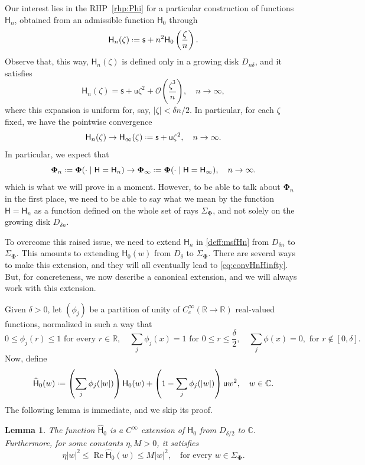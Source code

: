 \documentclass[reqno,a4paper,11pt]{amsart}
\DeclareMathOperator{\re}{Re}
\newcommand{\C}{\mathbb{C}}
\newcommand{\R}{\mathbb{R}}
\newcommand{\Boh}{\mathcal{O}}
\newcommand*{\deff}{\mathrel{\vcenter{\baselineskip0.5ex \lineskiplimit0pt
                     \hbox{\scriptsize.}\hbox{\scriptsize.}}}%
                     =}
\renewcommand{\bm}{\mathbf}
\newcommand{\msf}{\mathsf}
\newcommand{\wh}{\widehat}
\newcommand{\sad}{\msf s}
\newcommand{\uad}{\msf u}
\newtheorem{lemma}[theorem]{Lemma}
\theoremstyle{definition}
\theoremstyle{remark}
\numberwithin{equation}{section}
\begin{document}
Our interest lies in the RHP~\ref{rhp:Phi} for a particular construction of functions $\msf H_n$, obtained from an admissible function $\msf H_0$ through
%
\begin{equation}\label{deff:msfHn}
\msf H_n(\zeta)\deff \sad+n^2\msf H_0\left(\frac{\zeta}{n}\right).
\end{equation}
%
Observe that, this way, $\msf H_n(\zeta)$ is defined only in a growing disk $D_{n\delta}$, and it satisfies
%
$$
\msf H_n(\zeta)=\sad+\uad \zeta^2 + \Boh\left( \frac{\zeta^3}{n} \right),\quad n\to \infty,
$$
%
where this expansion is uniform for, say, $|\zeta|<\delta n/2$. In particular, for each $\zeta$ fixed, we have the pointwise convergence
%
\begin{equation}\label{eq:convHnHinfty}
\msf H_n(\zeta)\to \msf H_\infty(\zeta)\deff \sad +\uad \zeta^2,\quad n\to \infty.
\end{equation}
%
In particular, we expect that 
%
\begin{equation}\label{eq:Phi_Definition}
\bm \Phi_n\deff \bm \Phi(\cdot\mid \msf H=\msf H_n)\to \bm \Phi_\infty\deff \bm \Phi(\cdot\mid \msf H=\msf H_\infty),\quad n\to \infty.
\end{equation}
%
which is what we will prove in a moment. However, to be able to talk about $\bm \Phi_n$ in the first place, we need to be able to say what we mean by the function $\msf H=\msf H_n$ as a function defined on the whole set of rays $\Sigma_{\bm \Phi}$, and not solely on the growing disk $D_{\delta n}$. 

To overcome this raised issue, we need to extend $\msf H_n$ in \eqref{deff:msfHn} from $D_{\delta n}$ to $\Sigma_{\bm \Phi}$. This amounts to extending $\msf H_0(w)$ from $D_{\delta}$ to $\Sigma_{\bm \Phi}$. There are several ways to make this extension, and they will all eventually lead to \eqref{eq:convHnHinfty}. But, for concreteness, we now describe a canonical extension, and we will always work with this extension.

Given $\delta>0$, let $(\phi_j)$ be a partition of unity of $C^\infty_c(\R\to\R)$ real-valued functions, normalized in such a way that
%
$$
0\leq \phi_j(r)\leq 1\text{ for every } r\in \R,\quad \sum_{j}\phi_j(x)=1 \text{ for } 0\leq r\leq \frac{\delta}{2},\quad \sum_{j} \phi(x)=0, \text{ for } r\notin [0,\delta].
$$
%
Now, define
%
\begin{equation}\label{deff:extensionhatH}
\wh{\msf H}_0(w)\deff \left(\sum_j \phi_j(|w|)\right)\msf H_0(w)+\left(1-\sum_{j}\phi_j(|w|)\right)\uad w^2,\quad w\in \C.
\end{equation}
%
The following lemma is immediate, and we skip its proof.
%
\begin{lemma}\label{lem:fundineqH}
   The function $\wh{\msf H}_0$ is a $C^\infty$ extension of $\msf H_0$ from $D_{\delta/2}$ to $\C$. Furthermore, for some constants $\eta, M>0$, it satisfies
   $$
   \eta|w|^2\leq \re \wh{\msf H}_0(w)\leq M|w|^2,\quad \text{for every }w\in \Sigma_{\bm\Phi}.
   $$
\end{lemma}
\end{document}
